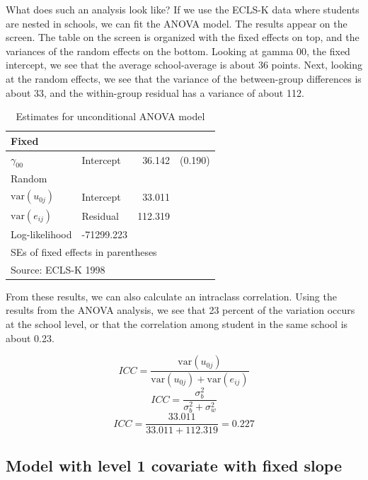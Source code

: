 What does such an analysis look like? If we use the ECLS-K data where students are nested in schools, we can fit the ANOVA model. The results appear on the screen. The table on the screen is organized with the fixed effects on top, and the variances of the random effects on the bottom.  Looking at gamma 00, the fixed intercept, we see that the average school-average is about 36 points. Next, looking at the random effects, we see that the variance of the between-group differences is about 33, and the within-group residual has a variance of about 112.

\begin{table}
  \centering
  \begin{center}

\begin{tabular}{llrr}
\hline
\multicolumn{4}{l}{Fixed} 			 \\
\hline
$\gamma_{00}$	&	Intercept    	&   36.142 &   (0.190)  \\
\hline
\multicolumn{4}{l}{Random}	  \\
\hline
	
$\mbox{var}\left(u_{0j}\right)$	&	Intercept    	&   33.011  \\
$\mbox{var}\left(e_{ij}\right)$ 		&	Residual	& 	 112.319   \\
\hline
Log-likelihood 			& -71299.223 \\
\hline
\multicolumn{4}{l}{SEs of fixed effects in parentheses} \\
\multicolumn{4}{l}{Source: ECLS-K 1998} \\
\hline
\end{tabular}
\end{center}
  \caption{Estimates for unconditional ANOVA model}\label{ecls1}
\end{table}

From these results, we can also calculate an intraclass correlation. Using the results from the ANOVA analysis, we see that 23 percent of the variation occurs at the school level, or that the correlation among student in the same school is about 0.23.

\[
ICC = \frac{\mbox{var}\left(u_{0j}\right)}{\mbox{var}\left(u_{0j}\right)+\mbox{var}\left(e_{ij}\right)}
\]
\[
ICC = \frac{\sigma_b^2}{\sigma_b^2+\sigma_w^2}
\]
\[
ICC = \frac{33.011}{33.011+112.319} = 0.227
\]

\subsection{Model with level 1 covariate with fixed slope}


